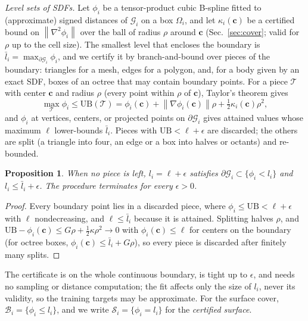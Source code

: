 \documentclass[journal]{IEEEtran}
\newtheorem{proposition}{Proposition}
\theoremstyle{definition}
\newcommand{\norm}[1]{\left\lVert #1\right\rVert}
\begin{document}
\emph{Level sets of SDFs.} Let $\phi_i$ be a tensor-product cubic B-spline fitted to (approximate)
signed distances of $\mathcal G_i$ on a box $\Omega_i$, and let $\kappa_i(\mathbf c)$ be a certified
bound on $\norm{\nabla^2\phi_i}$ over the ball of radius $\rho$ around $\mathbf c$ (Sec.~\ref{sec:cover};
valid for $\rho$ up to the cell size). The smallest level that encloses the boundary is
$\bar l_i=\max_{\partial\mathcal G_i}\phi_i$, and we certify it by branch-and-bound over pieces of the
boundary: triangles for a mesh, edges for a polygon, and, for a body given by an exact SDF, boxes of an
octree that may contain boundary points. For a piece $\mathcal T$ with center $\mathbf c$ and radius
$\rho$ (every point within $\rho$ of $\mathbf c$), Taylor's theorem gives
\begin{equation}\label{eq:level-ub}
\max_{\mathcal T}\phi_i\le\mathrm{UB}(\mathcal T)=\phi_i(\mathbf c)+\norm{\nabla\phi_i(\mathbf c)}\rho
+\tfrac12\kappa_i(\mathbf c)\rho^2 ,
\end{equation}
and $\phi_i$ at vertices, centers, or projected points on $\partial\mathcal G_i$ gives attained values
whose maximum $\ell$ lower-bounds $\bar l_i$. Pieces with $\mathrm{UB}<\ell+\epsilon$ are discarded;
the others are split (a triangle into four, an edge or a box into halves or octants) and re-bounded.
\begin{proposition}\label{prop:level}
When no piece is left, $l_i=\ell+\epsilon$ satisfies $\partial\mathcal G_i\subset\{\phi_i<l_i\}$ and
$l_i\le\bar l_i+\epsilon$. The procedure terminates for every $\epsilon>0$.
\end{proposition}
\begin{proof}
Every boundary point lies in a discarded piece, where $\phi_i\le\mathrm{UB}<\ell+\epsilon$ with $\ell$
nondecreasing, and $\ell\le\bar l_i$ because it is attained. Splitting halves $\rho$, and
$\mathrm{UB}-\phi_i(\mathbf c)\le G\rho+\tfrac12\kappa\rho^2\to0$ with $\phi_i(\mathbf c)\le\ell$ for
centers on the boundary (for octree boxes, $\phi_i(\mathbf c)\le\bar l_i+G\rho$), so every piece is
discarded after finitely many splits.
\end{proof}
The certificate is on the whole continuous boundary, is tight up to $\epsilon$, and needs no
sampling or distance computation; the fit affects only the size of $l_i$, never its validity, so the
training targets may be approximate. For the surface cover, $\mathcal B_i=\{\phi_i\le l_i\}$, and we
write $\mathcal S_i=\{\phi_i=l_i\}$ for the \emph{certified surface}.
\end{document}
